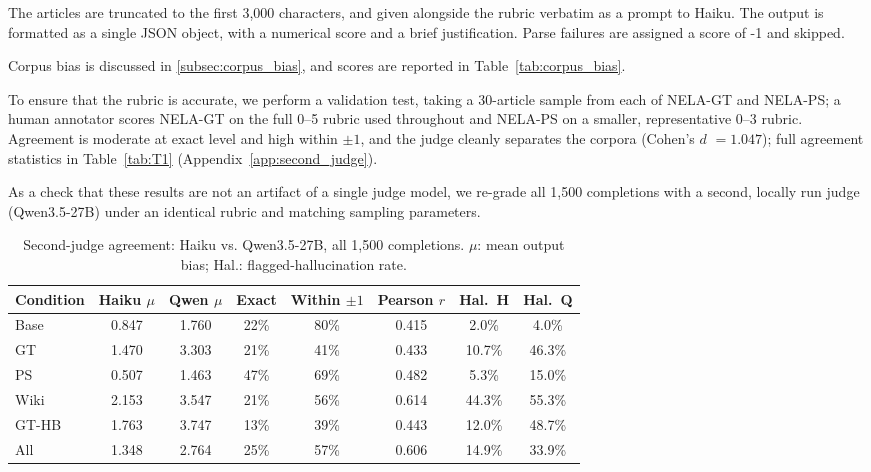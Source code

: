 \documentclass[11pt]{article}
\begin{document}
The articles are truncated to the first 3{,}000 characters, and given alongside the rubric verbatim as a prompt to Haiku. 
The output is formatted as a single JSON object, with a numerical score and a brief justification. Parse failures are assigned a score of -1 and skipped.

Corpus bias is discussed in \ref{subsec:corpus_bias}, and scores are reported in Table~\ref{tab:corpus_bias}. 


To ensure that the rubric is accurate, we perform a validation test, taking a 30-article sample from each of NELA-GT and NELA-PS; a human annotator scores NELA-GT on the full 0--5 rubric used throughout and NELA-PS on a smaller, representative 0--3 rubric.
Agreement is moderate at exact level and high within $\pm1$, and the judge cleanly separates the corpora (Cohen's $d$ \cite{cohen1988} $= 1.047$); full agreement statistics in Table~\ref{tab:T1} (Appendix~\ref{app:second_judge}).

As a check that these results are not an artifact of a single judge model, we re-grade all 1{,}500 completions with a second, locally run judge (Qwen3.5-27B) under an identical rubric and matching sampling parameters.

\begin{table}[t]
  \centering
  \footnotesize
  \setlength{\tabcolsep}{6pt}
  \begin{tabular}{lccccccc}
    \toprule
    Condition & Haiku $\mu$ & Qwen $\mu$ & Exact & Within $\pm1$ & Pearson $r$ & Hal.\ H & Hal.\ Q \\
    \midrule
    Base  & 0.847 & 1.760 & 22\% & 80\% & 0.415 &  2.0\% &  4.0\% \\
    GT    & 1.470 & 3.303 & 21\% & 41\% & 0.433 & 10.7\% & 46.3\% \\
    PS    & 0.507 & 1.463 & 47\% & 69\% & 0.482 &  5.3\% & 15.0\% \\
    Wiki  & 2.153 & 3.547 & 21\% & 56\% & 0.614 & 44.3\% & 55.3\% \\
    GT-HB & 1.763 & 3.747 & 13\% & 39\% & 0.443 & 12.0\% & 48.7\% \\
    \midrule
    All   & 1.348 & 2.764 & 25\% & 57\% & 0.606 & 14.9\% & 33.9\% \\
    \bottomrule
  \end{tabular}
  \caption{Second-judge agreement: Haiku vs. Qwen3.5-27B, all 1{,}500 completions. $\mu$: mean output bias; Hal.: flagged-hallucination rate.}
  \label{tab:second_judge}
\end{table}
\end{document}
